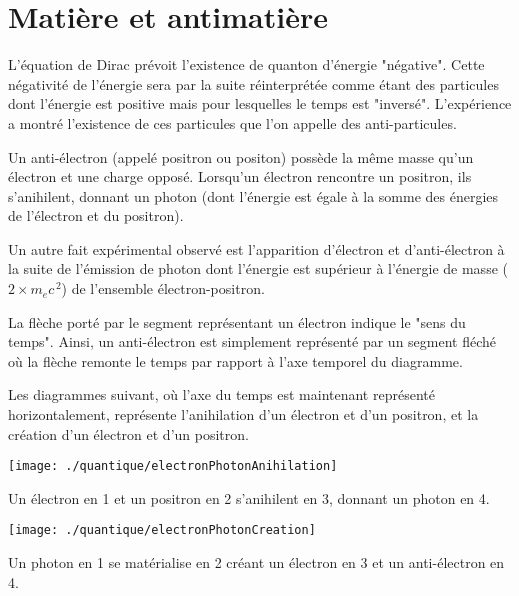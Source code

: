 

\section{Matière et antimatière}



L'équation de Dirac prévoit l'existence de quanton d'énergie "négative". Cette négativité de l'énergie sera par la suite réinterprétée comme étant des particules dont l'énergie est positive mais pour lesquelles le temps est "inversé". L'expérience a montré l'existence de ces particules que l'on appelle des anti-particules.

Un anti-électron (appelé positron ou positon) possède la même masse qu'un électron et une charge opposé. Lorsqu'un électron rencontre un positron, ils s'anihilent, donnant un photon (dont l'énergie est égale à la somme des énergies de l'électron et du positron).

Un autre fait expérimental observé est l'apparition d'électron et d'anti-électron à la suite de l'émission de photon dont l'énergie est supérieur à l'énergie de masse ($2\times m_ec^{\,2}$) de l'ensemble électron-positron.

La flèche porté par le segment représentant un électron indique le "sens du temps". Ainsi, un anti-électron est simplement représenté par un segment fléché où la flèche remonte le temps par rapport à l'axe temporel du diagramme.

Les diagrammes suivant, où l'axe du temps est maintenant représenté horizontalement, représente l'anihilation d'un électron et d'un positron, et la création d'un électron et d'un positron.

\begin{minipage}[c]{.45\linewidth}
\begin{center}
\texttt{[image: ./quantique/electronPhotonAnihilation]}
\end{center}
Un électron en 1 et un positron en 2 s'anihilent en 3, donnant un photon en 4.
\end{minipage}
\hfill
\begin{minipage}[c]{.45\linewidth}
\begin{center}
\texttt{[image: ./quantique/electronPhotonCreation]}
\end{center}
Un photon en 1 se matérialise en 2 créant un électron en 3 et un anti-électron en 4.
\end{minipage}

